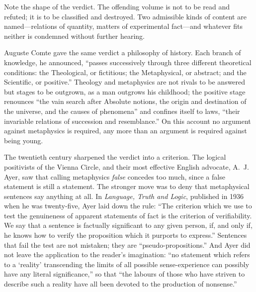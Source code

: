 Note the shape of the verdict. The offending volume is not to be read and refuted; it is to be classified and destroyed. Two admissible kinds of content are named---relations of quantity, matters of experimental fact---and whatever fits neither is condemned without further hearing.

Auguste Comte gave the same verdict a philosophy of history. Each branch of knowledge, he announced, ``passes successively through three different theoretical conditions: the Theological, or fictitious; the Metaphysical, or abstract; and the Scientific, or positive.'' Theology and metaphysics are not rivals to be answered but stages to be outgrown, as a man outgrows his childhood; the positive stage renounces ``the vain search after Absolute notions, the origin and destination of the universe, and the causes of phenomena'' and confines itself to laws, ``their invariable relations of succession and resemblance.'' On this account no argument against metaphysics is required, any more than an argument is required against being young.

The twentieth century sharpened the verdict into a criterion. The logical positivists of the Vienna Circle, and their most effective English advocate, A.~J. Ayer, saw that calling metaphysics \emph{false} concedes too much, since a false statement is still a statement. The stronger move was to deny that metaphysical sentences say anything at all. In \emph{Language, Truth and Logic}, published in 1936 when he was twenty-five, Ayer laid down the rule: ``The criterion which we use to test the genuineness of apparent statements of fact is the criterion of verifiability. We say that a sentence is factually significant to any given person, if, and only if, he knows how to verify the proposition which it purports to express.'' Sentences that fail the test are not mistaken; they are ``pseudo-propositions.'' And Ayer did not leave the application to the reader's imagination: ``no statement which refers to a `reality' transcending the limits of all possible sense-experience can possibly have any literal significance,'' so that ``the labours of those who have striven to describe such a reality have all been devoted to the production of nonsense.''

